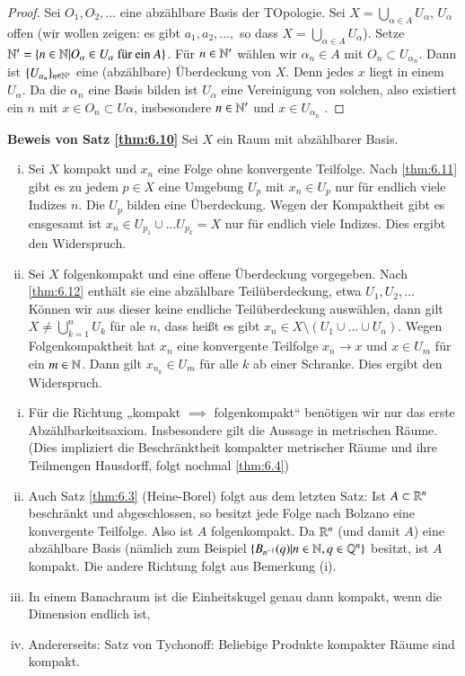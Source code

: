 \documentclass[a4paper,10pt]{scrartcl}
\begin{document}
\begin{proof}
 Sei $O_1,O_2,...$ eine abzählbare Basis der TOpologie. Sei $X=\bigcup_{\alpha\in A} U_\alpha$, $U_\alpha$ 
offen (wir wollen zeigen:  es gibt $a_1, a_2,...,$ so dass $X=\bigcup_{\alpha\in A}U_\alpha$). 
Setze $\mathbb{N}'=\{n\in \mathbb{N}|O_\alpha\in U_\alpha \text{ für ein } A\}$.
Für $n\in \mathbb{N}'$ wählen wir $\alpha_n\in A$ mit $O_n\subset U_{\alpha_n}$. Dann ist $\{U_{\alpha_n}\}_{n\in \mathbb{N}'}$ eine (abzählbare) Überdeckung von $X$. 
Denn jedes $x$ liegt in einem $U_\alpha$. Da die $\alpha_n$ eine Basis bilden ist $U_\alpha$ eine Vereinigung von solchen, also existiert ein $n$ mit $x\in O_n\subset U\alpha$, insbesondere $n\in \mathbb{N}'$ und $x\in U_{\alpha_n}$ .
\end{proof}
\begin{seg}{\textbf{Beweis von Satz \ref{thm:6.10}}}
 Sei $X$ ein Raum mit abzählbarer Basis.
\begin{enumerate}[(i)]
 \item Sei $X$ kompakt und $x_n$ eine Folge ohne konvergente Teilfolge. Nach \ref{thm:6.11} gibt es zu jedem $p\in X$ eine Umgebung $U_p$ mit $x_n\in U_p$ nur für endlich viele Indizes $n$. Die $U_p$ bilden eine Überdeckung. Wegen der Kompaktheit gibt es ensgesamt ist $x_n\in U_{p_1}\cup... U_{p_k}=X$ nur für endlich viele Indizes. Dies ergibt den Widerspruch.
 \item Sei $X$ folgenkompakt und eine offene Überdeckung vorgegeben. Nach \ref{thm:6.12} enthält sie eine abzählbare Teilüberdeckung, etwa $U_1, U_2, ...$ Können wir aus dieser keine endliche Teilüberdeckung auswählen, dann gilt $X\neq \bigcup_{k=1}^nU_k$ für ale $n$, dass heißt es gibt $x_n\in X\setminus(U_1\cup...\cup U_n)$. Wegen Folgenkompaktheit hat $x_n$ eine konvergente Teilfolge $x_n \to x$ und $x\in U_m$ für ein $m\in \mathbb{N}$. Dann gilt $x_{n_k}\in U_m$ für alle $k$ ab einer Schranke. Dies ergibt den Widerspruch.
\end{enumerate}
\end{seg}
\begin{note*}
 \begin{enumerate}[(i)]
  \item Für die Richtung „kompakt $\implies$ folgenkompakt“ benötigen wir nur das erste Abzählbarkeitsaxiom. 
Insbesondere gilt die Aussage in metrischen Räume.  
(Dies impliziert die Beschränktheit kompakter metrischer Räume und ihre Teilmengen Hausdorff, folgt nochmal \ref{thm:6.4})
\item Auch Satz \ref{thm:6.3} (Heine-Borel) folgt aus dem letzten Satz: Ist $A\subset \mathbb{R}^n$ beschränkt und abgeschlossen, so besitzt jede Folge nach Bolzano eine konvergente Teilfolge.
Also ist $A$ folgenkompakt. Da $\mathbb{R}^n$ (und damit $A$) eine abzählbare Basis (nämlich zum Beispiel $\{B_{n^{-1}} (q)|n\in \mathbb{N}, q\in \mathbb{Q}^n\}$ besitzt,
ist $A$ kompakt. Die andere Richtung folgt aus Bemerkung (i).
\item In einem Banachraum ist die Einheitskugel genau dann kompakt, wenn die Dimension endlich ist,
\item Andererseits: Satz von Tychonoff: Beliebige Produkte kompakter Räume sind kompakt.
 \end{enumerate}
\end{note*}
\end{document}
